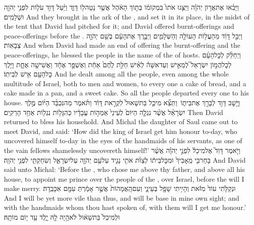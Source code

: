 {וַיָּבִ֜אוּ אֶת\maqqaf אֲר֣וֹן יְהֹוָ֗ה וַיַּצִּ֤גוּ אֹתוֹ֙ בִּמְקוֹמ֔וֹ בְּת֣וֹךְ הָאֹ֔הֶל אֲשֶׁ֥ר נָטָה\maqqaf ל֖וֹ דָּוִ֑ד וַיַּ֨עַל דָּוִ֥ד עֹל֛וֹת לִפְנֵ֥י יְהֹוָ֖ה וּשְׁלָמִֽים׃}
{And they brought in the ark of the \lord, and set it in its place, in the midst of the tent that David had pitched for it; and David offered burnt-offerings and peace-offerings before the \lord.}
{וַיְכַ֣ל דָּוִ֔ד מֵהַעֲל֥וֹת הָעוֹלָ֖ה וְהַשְּׁלָמִ֑ים וַיְבָ֣רֶךְ אֶת\maqqaf הָעָ֔ם בְּשֵׁ֖ם יְהֹוָ֥ה צְבָאֽוֹת׃}
{And when David had made an end of offering the burnt-offering and the peace-offerings, he blessed the people in the name of the \lord\space of hosts.}
{וַיְחַלֵּ֨ק לְכׇל\maqqaf הָעָ֜ם לְכׇל\maqqaf הֲמ֣וֹן יִשְׂרָאֵל֮ לְמֵאִ֣ישׁ וְעַד\maqqaf אִשָּׁה֒ לְאִ֗ישׁ חַלַּ֥ת לֶ֙חֶם֙ אַחַ֔ת וְאֶשְׁפָּ֣ר אֶחָ֔ד וַאֲשִׁישָׁ֖ה אֶחָ֑ת וַיֵּ֥לֶךְ כׇּל\maqqaf הָעָ֖ם אִ֥ישׁ לְבֵיתֽוֹ׃}
{And he dealt among all the people, even among the whole multitude of Israel, both to men and women, to every one a cake of bread, and a cake made in a pan, and a sweet cake. So all the people departed every one to his house.}
{וַיָּ֥שׇׁב דָּוִ֖ד לְבָרֵ֣ךְ אֶת\maqqaf בֵּית֑וֹ \setuma  וַתֵּצֵ֞א מִיכַ֤ל בַּת\maqqaf שָׁאוּל֙ לִקְרַ֣את דָּוִ֔ד וַתֹּ֗אמֶר מַה\maqqaf נִּכְבַּ֨ד הַיּ֜וֹם מֶ֣לֶךְ יִשְׂרָאֵ֗ל אֲשֶׁ֨ר נִגְלָ֤ה הַיּוֹם֙ לְעֵינֵי֙ אַמְה֣וֹת עֲבָדָ֔יו כְּהִגָּל֥וֹת נִגְל֖וֹת אַחַ֥ד הָרֵקִֽים׃}
{Then David returned to bless his household. And Michal the daughter of Saul came out to meet David, and said: ‘How did the king of Israel get him honour to-day, who uncovered himself to-day in the eyes of the handmaids of his servants, as one of the vain fellows shamelessly uncovereth himself!’}
{וַיֹּ֣אמֶר דָּוִד֮ אֶל\maqqaf מִיכַל֒ לִפְנֵ֣י יְהֹוָ֗ה אֲשֶׁ֨ר בָּחַר\maqqaf בִּ֤י מֵֽאָבִיךְ֙ וּמִכׇּל\maqqaf בֵּית֔וֹ לְצַוֺּ֨ת אֹתִ֥י נָגִ֛יד עַל\maqqaf עַ֥ם יְהֹוָ֖ה עַל\maqqaf יִשְׂרָאֵ֑ל וְשִׂחַקְתִּ֖י לִפְנֵ֥י יְהֹוָֽה׃}
{And David said unto Michal: ‘Before the \lord, who chose me above thy father, and above all his house, to appoint me prince over the people of the \lord, over Israel, before the \lord\space will I make merry.}
{וּנְקַלֹּ֤תִי עוֹד֙ מִזֹּ֔את וְהָיִ֥יתִי שָׁפָ֖ל בְּעֵינָ֑י וְעִם\maqqaf הָֽאֲמָהוֹת֙ אֲשֶׁ֣ר אָמַ֔רְתְּ עִמָּ֖ם אִכָּבֵֽדָה׃}
{And I will be yet more vile than thus, and will be base in mine own sight; and with the handmaids whom thou hast spoken of, with them will I get me honour.’}
{וּלְמִיכַל֙ בַּת\maqqaf שָׁא֔וּל לֹא\maqqaf הָ֥יָה לָ֖הּ יָ֑לֶד עַ֖ד י֥וֹם מוֹתָֽהּ׃ \petucha }
